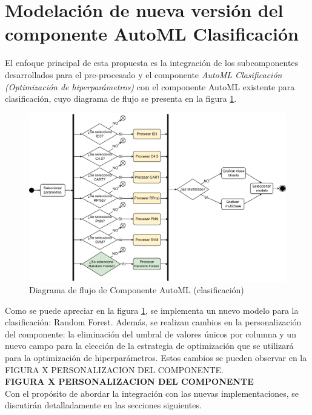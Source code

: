 \section{Modelación de nueva versión del componente AutoML Clasificación}
El enfoque principal de esta propuesta es la integración de los subcomponentes desarrollados para el pre-procesado y el componente \textit{AutoML Clasificación (Optimización de hiperparámetros)} con el componente AutoML existente para clasificación, cuyo diagrama de flujo se presenta en la figura \ref{fig:diagrama-general-componente}. \\

\begin{figure}[H]
	\centering
	\includegraphics[width=1\linewidth]{"figuras/capi 2/Diagrama General Componente"}
	\caption{Diagrama de flujo de Componente AutoML (clasificación)}
	\label{fig:diagrama-general-componente}
\end{figure}


Como se puede apreciar en la figura \ref{fig:diagrama-general-componente}, se implementa un nuevo modelo para la clasificación: Random Forest. Además, se realizan cambios en la personalización del componente: la eliminación del umbral de valores únicos por columna y un nuevo campo para la elección de la estrategia de optimización que se utilizará para la optimización de hiperparámetros. Estos cambios se pueden observar en la FIGURA X PERSONALIZACION DEL COMPONENTE. \\

\textbf{FIGURA X PERSONALIZACION DEL COMPONENTE} \\

Con el propósito de abordar la integración con las nuevas implementaciones, se discutirán detalladamente en las secciones siguientes.

